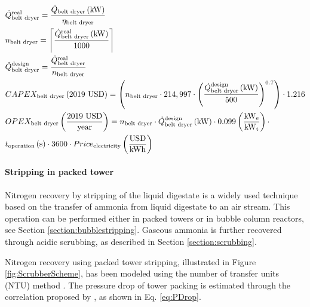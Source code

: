 \begin{refsection}[referencesCh6]
\begin{align}
& \dot{Q}_{\text{belt dryer}}^{\text{real}} = \frac{\dot{Q}_{\text{belt dryer}}\left(\text{kW}\right)}{\eta_{\text{belt dryer}}} \label{eq:QeltDryerReal} 
\\
& n_{\text{belt dryer}} = \ceil*{\frac{\dot{Q}_{\text{belt dryer}}^{\text{real}}\left(\text{kW}\right)}{1000}} \label{eq:nBeltDryer} 
\\
& \dot{Q}_{\text{belt dryer}}^{\text{design}} = \frac{\dot{Q}_{\text{belt dryer}}^{\text{real}}}{n_{\text{belt dryer}}} \label{eq:QeltDryerDesign} 
\\
& CAPEX_{\text{belt dryer}} \left(\text{2019 USD}\right) = \left(n_{\text{belt dryer}} \cdot 214,997 \cdot \left(\frac{\dot{Q}_{\text{belt dryer}}^{\text{design}}\left(\text{kW}\right)}{500}\right)^{0.7}\right) \cdot 1.216 \label{eq:CAPEXBeltDryer} 
\\
& OPEX_{\text{belt dryer}} \left(\frac{\text{2019 USD}}{\text{year}}\right) = n_{\text{belt dryer}} \cdot \dot{Q}_{\text{belt dryer}}^{\text{design}} \left(\text{kW}\right) \cdot 0.099 \left(\frac{\text{kW}_{\text{e}}}{\text{kW}_{\text{t}}}\right) \cdot \label{eq:BeltDryerOPEX}
\\ 
& t_{\text{operation}} \left(\text{s}\right) \cdot 3600 \cdot Price_{\text{electricity}} \left(\frac{\text{USD}}{\text{kWh}}\right)  \nonumber
\end{align}

\paragraph{\textbf{Stripping in packed tower}} \label{section:StrippingNrecovery}
Nitrogen recovery by stripping of the liquid digestate is a widely used technique based on the transfer of ammonia from liquid digestate to an air stream. This operation can be performed either in packed towers or in bubble column reactors, see Section \ref{section:bubblestripping}. Gaseous ammonia is further recovered through acidic scrubbing, as described in Section \ref{section:scrubbing}.

Nitrogen recovery using packed tower stripping, illustrated in Figure \ref{fig:ScrubberScheme}, has been modeled using the number of transfer units (NTU) method \citep{Metcalf}. The pressure drop of tower packing is estimated through the correlation proposed by \citet{kister1991predict}, as shown in Eq. \ref{eq:PDrop}. 


\end{refsection}
